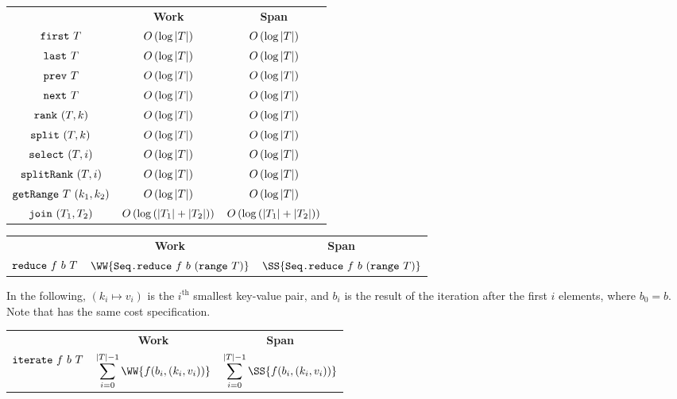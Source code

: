 \begin{costspec}
\begin{tabular}{c|c|c}
& \textbf{Work} & \textbf{Span} \\
$\texttt{first}~T$ & $O\left({\log|T|}\right)$ & $O\left({\log|T|}\right)$ \\
$\texttt{last}~T$ & $O\left({\log|T|}\right)$ & $O\left({\log|T|}\right)$ \\
$\texttt{prev}~T$ & $O\left({\log|T|}\right)$ & $O\left({\log|T|}\right)$ \\
$\texttt{next}~T$ & $O\left({\log|T|}\right)$ & $O\left({\log|T|}\right)$ \\
$\texttt{rank}~(T, k)$ & $O\left({\log|T|}\right)$ & $O\left({\log|T|}\right)$ \\
$\texttt{split}~(T, k)$ & $O\left({\log|T|}\right)$ & $O\left({\log|T|}\right)$ \\
$\texttt{select}~(T, i)$ & $O\left({\log|T|}\right)$ & $O\left({\log|T|}\right)$ \\
$\texttt{splitRank}~(T, i)$ & $O\left({\log|T|}\right)$ & $O\left({\log|T|}\right)$ \\
$\texttt{getRange}~T~(k_1, k_2)$ & $O\left({\log|T|}\right)$ & $O\left({\log|T|}\right)$
\\
$\texttt{join}~(T_1, T_2)$ &
$O\left({\log\left(|T_1| + |T_2|\right)}\right)$ &
$O\left({\log\left(|T_1| + |T_2|\right)}\right)$
\end{tabular}
\end{costspec}

\begin{costspec}[Reduce]
\begin{tabular}{c|c|c}
& \textbf{Work} & \textbf{Span} \\
$\texttt{reduce}~f~b~T$ &
$\WW{\sml{Seq.reduce}~f~b~(\sml{range}~T)}$ &
$\SS{\sml{Seq.reduce}~f~b~(\sml{range}~T)}$
\end{tabular}
\end{costspec}

\begin{costspec}[Iteration]
In the following, $(k_i \mapsto v_i)$ is the $i^\text{th}$ smallest key-value
pair, and $b_i$ is the result of the iteration after the first $i$ elements,
where $b_0 = b$. Note that  has the same cost specification.
\begin{tabular}{c|c|c}
& \textbf{Work} & \textbf{Span} \\
$\texttt{iterate}~f~b~T$ &
$\displaystyle\sum_{i=0}^{|T|-1} \WW{f(b_i, (k_i, v_i))}$ &
$\displaystyle\sum_{i=0}^{|T|-1} \SS{f(b_i, (k_i, v_i))}$
\end{tabular}
\end{costspec}

